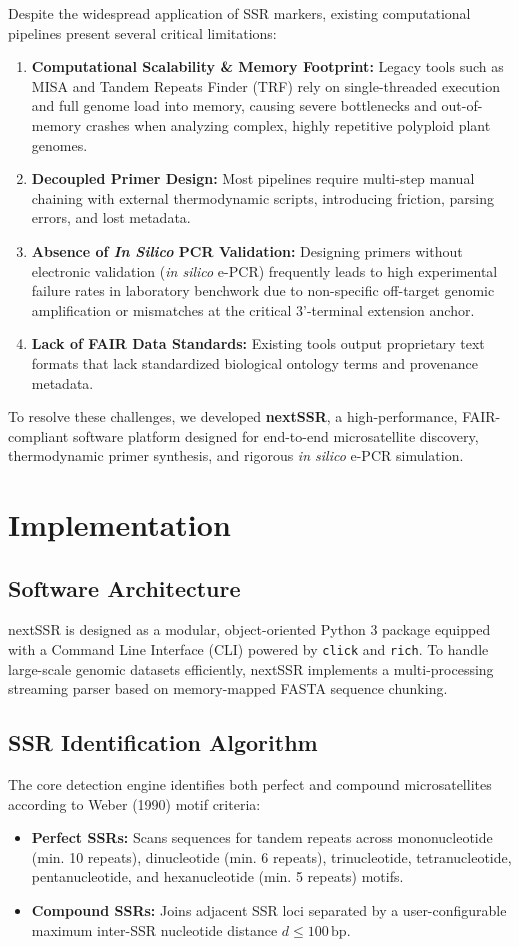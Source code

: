 \documentclass[fullpage]{article}
\begin{document}
Despite the widespread application of SSR markers, existing computational pipelines present several critical limitations:
\begin{enumerate}
    \item \textbf{Computational Scalability \& Memory Footprint:} Legacy tools such as MISA and Tandem Repeats Finder (TRF) rely on single-threaded execution and full genome load into memory, causing severe bottlenecks and out-of-memory crashes when analyzing complex, highly repetitive polyploid plant genomes.
    \item \textbf{Decoupled Primer Design:} Most pipelines require multi-step manual chaining with external thermodynamic scripts, introducing friction, parsing errors, and lost metadata.
    \item \textbf{Absence of \textit{In Silico} PCR Validation:} Designing primers without electronic validation (\textit{in silico} e-PCR) frequently leads to high experimental failure rates in laboratory benchwork due to non-specific off-target genomic amplification or mismatches at the critical 3'-terminal extension anchor.
    \item \textbf{Lack of FAIR Data Standards:} Existing tools output proprietary text formats that lack standardized biological ontology terms and provenance metadata.
\end{enumerate}

To resolve these challenges, we developed \textbf{nextSSR}, a high-performance, FAIR-compliant software platform designed for end-to-end microsatellite discovery, thermodynamic primer synthesis, and rigorous \textit{in silico} e-PCR simulation.

\section*{Implementation}
\subsection*{Software Architecture}
nextSSR is designed as a modular, object-oriented Python 3 package equipped with a Command Line Interface (CLI) powered by \texttt{click} and \texttt{rich}. To handle large-scale genomic datasets efficiently, nextSSR implements a multi-processing streaming parser based on memory-mapped FASTA sequence chunking.

\subsection*{SSR Identification Algorithm}
The core detection engine identifies both perfect and compound microsatellites according to Weber (1990) motif criteria:
\begin{itemize}
    \item \textbf{Perfect SSRs:} Scans sequences for tandem repeats across mononucleotide (min. 10 repeats), dinucleotide (min. 6 repeats), trinucleotide, tetranucleotide, pentanucleotide, and hexanucleotide (min. 5 repeats) motifs.
    \item \textbf{Compound SSRs:} Joins adjacent SSR loci separated by a user-configurable maximum inter-SSR nucleotide distance $d \le 100\,\text{bp}$.
\end{itemize}
\end{document}
